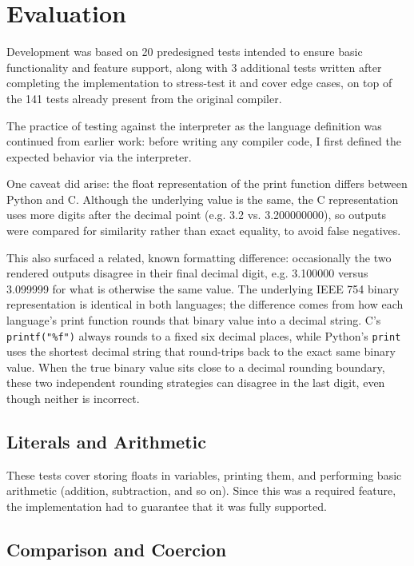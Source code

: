 \chapter{Evaluation}\label{chap:evaluation}

Development was based on 20 predesigned tests intended to ensure basic functionality and feature support, along with 3 additional tests written after completing the implementation to stress-test it and cover edge cases, on top of the 141 tests already present from the original compiler.

The practice of testing against the interpreter as the language definition was continued from earlier work: before writing any compiler code, I first defined the expected behavior via the interpreter.

One caveat did arise: the float representation of the print function differs between Python and C. Although the underlying value is the same, the C representation uses more digits after the decimal point (e.g. 3.2 vs. 3.200000000), so outputs were compared for similarity rather than exact equality, to avoid false negatives.

This also surfaced a related, known formatting difference: occasionally the two rendered outputs disagree in their final decimal digit, e.g. 3.100000 versus 3.099999 for what is otherwise the same value. The underlying IEEE 754 binary representation is identical in both languages; the difference comes from how each language's print function rounds that binary value into a decimal string. C's \texttt{printf("\%f")} always rounds to a fixed six decimal places, while Python's \texttt{print} uses the shortest decimal string that round-trips back to the exact same binary value. When the true binary value sits close to a decimal rounding boundary, these two independent rounding strategies can disagree in the last digit, even though neither is incorrect.


\section{Literals and Arithmetic}

These tests cover storing floats in variables, printing them, and performing basic arithmetic (addition, subtraction, and so on). Since this was a required feature, the implementation had to guarantee that it was fully supported.

\section{Comparison and Coercion}

